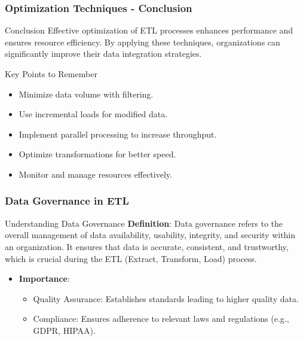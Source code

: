 \documentclass{beamer}
\begin{document}
\begin{frame}[fragile]
    \frametitle{Optimization Techniques - Conclusion}
    \begin{block}{Conclusion}
        Effective optimization of ETL processes enhances performance and ensures resource efficiency. By applying these techniques, organizations can significantly improve their data integration strategies.
    \end{block}
    
    \begin{block}{Key Points to Remember}
        \begin{itemize}
            \item Minimize data volume with filtering.
            \item Use incremental loads for modified data.
            \item Implement parallel processing to increase throughput.
            \item Optimize transformations for better speed.
            \item Monitor and manage resources effectively.
        \end{itemize}
    \end{block}
\end{frame}

\begin{frame}[fragile]
    \frametitle{Data Governance in ETL}
    \begin{block}{Understanding Data Governance}
        \textbf{Definition}: Data governance refers to the overall management of data availability, usability, integrity, and security within an organization. It ensures that data is accurate, consistent, and trustworthy, which is crucial during the ETL (Extract, Transform, Load) process.
    \end{block}
    
    \begin{itemize}
        \item \textbf{Importance}:
        \begin{itemize}
            \item Quality Assurance: Establishes standards leading to higher quality data.
            \item Compliance: Ensures adherence to relevant laws and regulations (e.g., GDPR, HIPAA).
        \end{itemize}
    \end{itemize}
\end{frame}
\end{document}
